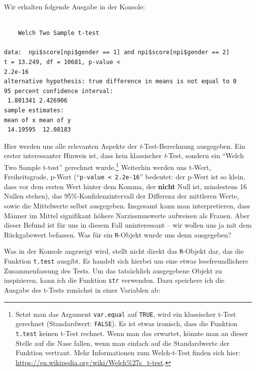 \documentclass[12pt,]{tufte-book}
\newenvironment{Shaded}{\begin{snugshade}}{\end{snugshade}}
\newcommand{\KeywordTok}[1]{\textcolor[rgb]{0.13,0.29,0.53}{\textbf{#1}}}
\newcommand{\DecValTok}[1]{\textcolor[rgb]{0.00,0.00,0.81}{#1}}
\newcommand{\StringTok}[1]{\textcolor[rgb]{0.31,0.60,0.02}{#1}}
\newcommand{\OperatorTok}[1]{\textcolor[rgb]{0.81,0.36,0.00}{\textbf{#1}}}
\newcommand{\NormalTok}[1]{#1}
\theoremstyle{definition}
\theoremstyle{definition}
\theoremstyle{definition}
\theoremstyle{remark}
\begin{document}
Wir erhalten folgende Ausgabe in der Konsole:

\begin{verbatim}

    Welch Two Sample t-test

data:  npi$score[npi$gender == 1] and npi$score[npi$gender == 2]
t = 13.249, df = 10681, p-value <
2.2e-16
alternative hypothesis: true difference in means is not equal to 0
95 percent confidence interval:
 1.801341 2.426906
sample estimates:
mean of x mean of y 
 14.19595  12.08183 
\end{verbatim}

Hier werden uns alle relevanten Aspekte der \emph{t}-Test-Berechnung
ausgegeben. Ein erster interessanter Hinweis ist, dass kein klassischer
\emph{t}-Test, sondern ein ``Welch Two Sample t-test'' gerechnet
wurde.\footnote{Setzt man das Argument \texttt{var.equal} auf
  \texttt{TRUE}, wird ein klassischer t-Test gerechnet (Standardwert:
  \texttt{FALSE}). Es ist etwas ironisch, dass die Funktion
  \texttt{t.test} keinen t-Test rechnet. Wenn man das erwartet, könnte
  man an dieser Stelle auf die Nase fallen, wenn man einfach auf die
  Standardwerte der Funktion vertraut. Mehr Informationen zum
  Welch-t-Test finden sich hier:
  \href{https://en.wikipedia.\%20org/wiki/\%20Welch\%27s_t-test}{https://en.wikipedia.org/wiki/Welch\%27s\_t-test}.}
Weiterhin werden uns t-Wert, Freiheitsgrade, p-Wert
(``\texttt{p-value\ \textless{}\ 2.2e-16}'' bedeutet: der p-Wert ist so
klein, dass vor dem ersten Wert hinter dem Komma, der \textbf{nicht}
Null ist, mindestens 16 Nullen stehen), das 95\%-Konfidenzintervall der
Differenz der mittleren Werte, sowie die Mittelwerte selbst ausgegeben.
Insgesamt kann man interpretieren, dass Männer im Mittel signifikant
höhere Narzissmuswerte aufweisen als Frauen. Aber dieser Befund ist für
uns in diesem Fall uninteressant -- wir wollen uns ja mit dem
Rückgabewert befassen. Was für ein \texttt{R}-Objekt wurde uns denn
ausgegeben?

Was in der Konsole angezeigt wird, stellt nicht direkt das
\texttt{R}-Objekt dar, das die Funktion \texttt{t.test} ausgibt. Es
handelt sich hierbei um eine etwas lesefreundlichere Zusammenfassung des
Tests. Um das tatsächlich ausgegebene Objekt zu inspizieren, kann ich
die Funktion \texttt{str} verwenden. Dazu speichere ich die Ausgabe des
t-Tests zunächst in einer Variablen ab:

\begin{Shaded}
\end{Shaded}
\end{document}
